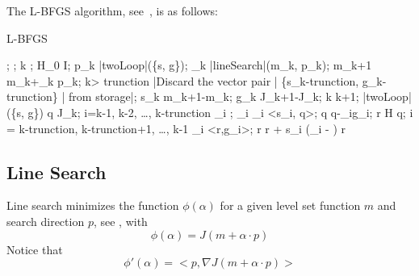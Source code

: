 The L-BFGS algorithm, see~\cite{Nocedal1980}, is as follows:
\begin{algorithm}
    \mbox{L-BFGS}
    \begin{program}
        \BEGIN
        ;
        ;
        k ;
        H_0 \leftarrow I;
        \WHILE \NOT{} \DO
        p_k \leftarrow |twoLoop|(\{s, g\});
        \alpha_k \leftarrow |lineSearch|(m_k, p_k); 
        m_{k+1} \leftarrow m_k+\alpha_k p_k;
        \IF k> trunction
        \THEN
            |Discard the vector pair | \{s_{k-trunction}, g_{k-trunction}\} | from storage|;
        \FI
        s_k \leftarrow m_{k+1}-m_k;
        g_k \leftarrow \nabla J_{k+1}-\nabla J_k;
        k \leftarrow k+1;
        \OD
        \WHERE
        \FUNCT |twoLoop|(\{s, g\}) \BODY
            \EXP q \leftarrow \nabla J_k;
            \FOR i=k-1, k-2, \ldots, k-trunction \DO
            \rho_i \leftarrow {};
            \alpha_i \leftarrow \rho_i <s_i, q>;
            q \leftarrow q-\alpha_i\cdot  g_i;
            \OD
            r \leftarrow H q;
            \FOR i = k-trunction, k-trunction+1, \ldots, k-1 \DO
            \beta \leftarrow \rho_i \cdot <r,g_i>;
            r \leftarrow r + s_i \cdot (\alpha_i - \beta)
            \OD
            r \ENDEXP \ENDFUNCT
        \END
    \end{program}
\end{algorithm}

\subsection{Line Search}\label{sec:LineSearch}
Line search minimizes the function $\phi(\alpha)$ for a given level set function $m$ and 
search direction $p$,  see \cite{Nocedal2006}, \cite{MoreThuente1992} with
\begin{equation}\label{EQU:MIN:22}
\phi(\alpha) = J(m+ \alpha \cdot  p)
\end{equation}
Notice that 
\begin{equation}\label{EQU:MIN:22}
\phi'(\alpha) = < p , \nabla J(m+\alpha \cdot p)> 
\end{equation}


